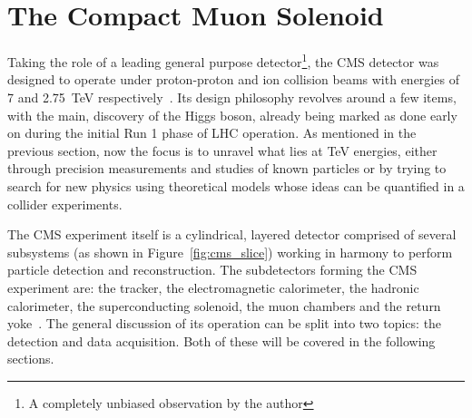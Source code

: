 \section{The Compact Muon Solenoid}
\hspace{10pt} Taking the role of a leading general purpose detector\footnote{A completely unbiased observation by the author}, the CMS detector was designed to operate under proton-proton and ion collision beams with energies of 7 and 2.75~TeV respectively~\cite{cms:tdr}. Its design philosophy revolves around a few items, with the main, discovery of the Higgs boson, already  being marked as done early on during the initial Run 1 phase of LHC operation. As mentioned in the previous section, now the focus is to unravel what lies at TeV energies, either through precision measurements and studies of known particles or by trying to search for new physics using theoretical models whose ideas can be quantified in a collider experiments. 

\hspace{10pt}The CMS experiment itself is a cylindrical, layered detector comprised of several subsystems (as shown in Figure~\ref{fig:cms_slice}) working in harmony to perform particle detection and reconstruction. The subdetectors forming the CMS experiment are: the tracker, the electromagnetic calorimeter, the hadronic calorimeter, the superconducting solenoid, the muon chambers and the return yoke~\cite{cms:paper}. The general discussion of its operation can be split into two topics: the detection and data acquisition. Both of these will be covered in the following sections.
